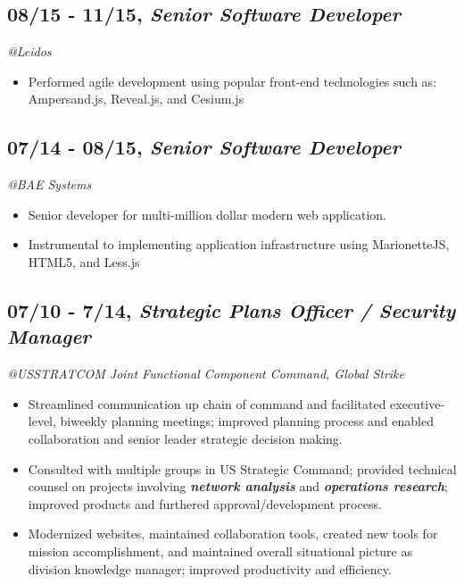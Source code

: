 \documentclass[10pt]{article}
\begin{document}
\subsection{\texorpdfstring{08/15 - 11/15, \textbf{\emph{Senior Software
Developer}}}{08/15 - 11/15, Senior Software Developer}}\label{senior-software-developer}

\emph{@Leidos }

\begin{itemize}
\itemsep1pt\parskip0pt
\item
  Performed agile development using popular front-end technologies such
  as: Ampersand.js, Reveal.js, and Cesium.js
\end{itemize}

\subsection{\texorpdfstring{07/14 - 08/15, \textbf{\emph{Senior Software
Developer}}}{07/14 - 08/15, Senior Software Developer}}\label{senior-software-developer-1}

\emph{@BAE Systems }

\begin{itemize}
\itemsep1pt\parskip0pt
\item
  Senior developer for multi-million dollar modern web application.
\item
  Instrumental to implementing application infrastructure using
  MarionetteJS, HTML5, and Less.js
\end{itemize}

\subsection{\texorpdfstring{07/10 - 7/14, \textbf{\emph{Strategic Plans
Officer / Security
Manager}}}{07/10 - 7/14, Strategic Plans Officer / Security Manager}}\label{strategic-plans-officer-security-manager}

\emph{@USSTRATCOM Joint Functional Component Command, Global Strike}

\begin{itemize}
\itemsep1pt\parskip0pt
\item
  Streamlined communication up chain of command and facilitated
  executive-level, biweekly planning meetings; improved planning process
  and enabled collaboration and senior leader strategic decision making.
\item
  Consulted with multiple groups in US Strategic Command; provided
  technical counsel on projects involving \textbf{\emph{network
  analysis}} and \textbf{\emph{operations research}}; improved products
  and furthered approval/development process.
\item
  Modernized websites, maintained collaboration tools, created new tools
  for mission accomplishment, and maintained overall situational picture
  as division knowledge manager; improved productivity and efficiency.
\end{itemize}
\end{document}
